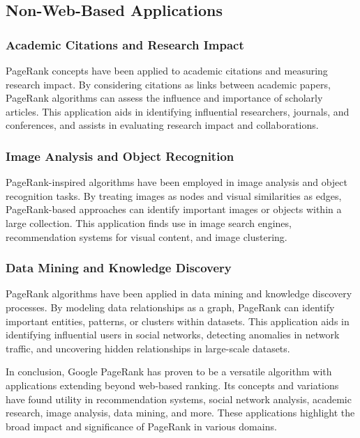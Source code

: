 \documentclass{article}
\begin{document}
\subsection{Non-Web-Based Applications}

\subsubsection{Academic Citations and Research Impact}

PageRank concepts have been applied to academic citations and measuring research impact. By considering citations as links between academic papers, PageRank algorithms can assess the influence and importance of scholarly articles. This application aids in identifying influential researchers, journals, and conferences, and assists in evaluating research impact and collaborations.

\subsubsection{Image Analysis and Object Recognition}

PageRank-inspired algorithms have been employed in image analysis and object recognition tasks. By treating images as nodes and visual similarities as edges, PageRank-based approaches can identify important images or objects within a large collection. This application finds use in image search engines, recommendation systems for visual content, and image clustering.

\subsubsection{Data Mining and Knowledge Discovery}

PageRank algorithms have been applied in data mining and knowledge discovery processes. By modeling data relationships as a graph, PageRank can identify important entities, patterns, or clusters within datasets. This application aids in identifying influential users in social networks, detecting anomalies in network traffic, and uncovering hidden relationships in large-scale datasets.

In conclusion, Google PageRank has proven to be a versatile algorithm with applications extending beyond web-based ranking. Its concepts and variations have found utility in recommendation systems, social network analysis, academic research, image analysis, data mining, and more. These applications highlight the broad impact and significance of PageRank in various domains.
\end{document}
